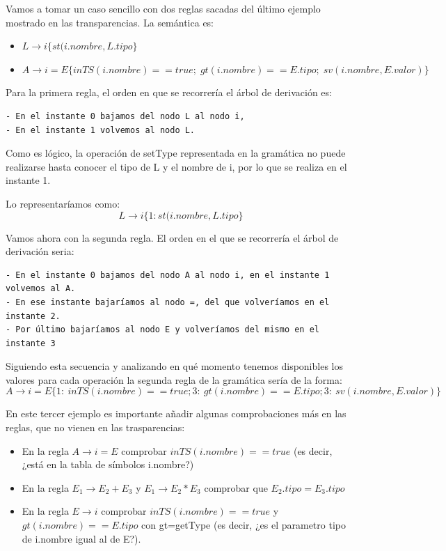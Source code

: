 \documentclass{apuntes}
\begin{document}
\begin{example}
Vamos a tomar un caso sencillo con dos reglas sacadas del último ejemplo mostrado en las transparencias. La semántica es:
\begin{itemize}
\item $L \rightarrow i \{st(i.nombre,L.tipo\}$
\item $A \rightarrow i = E \{in TS (i.nombre)==true; \; gt(i.nombre)==E.tipo; \; sv(i.nombre, E.valor)\} $
\end{itemize}

Para la primera regla, el orden en que se recorrería el árbol de derivación es:
\begin{verbatim}
- En el instante 0 bajamos del nodo L al nodo i,
- En el instante 1 volvemos al nodo L.
\end{verbatim}

Como es lógico, la operación de setType representada en la gramática no puede realizarse hasta conocer el tipo de L y el nombre de i, por lo que se realiza en el instante 1.

Lo representaríamos como:
\[L \rightarrow i \{1:st(i.nombre,L.tipo\}\]

Vamos ahora con la segunda regla. El orden en el que se recorrería el árbol de derivación seria:
\begin{verbatim}
- En el instante 0 bajamos del nodo A al nodo i, en el instante 1 volvemos al A.
- En ese instante bajaríamos al nodo =, del que volveríamos en el instante 2.
- Por último bajaríamos al nodo E y volveríamos del mismo en el instante 3
\end{verbatim}

Siguiendo esta secuencia y analizando en qué momento tenemos disponibles los valores para cada operación la segunda regla de la gramática sería de la forma:
\[A \rightarrow i = E \{ 1: \ in TS (i.nombre)==true; 3: \ gt(i.nombre)==E.tipo; 3: \ sv(i.nombre, E.valor)\}\]

En este tercer ejemplo es importante añadir algunas comprobaciones más en las reglas, que no vienen en las trasparencias:
\begin{itemize}
\item En la regla $A \rightarrow i=E$ comprobar $inTS(i.nombre)==true$ (es decir, ¿está en la tabla de símbolos i.nombre?)

\item En la regla $E_1 \rightarrow E_2 + E_3$ y $E_1 \rightarrow E_2 * E_3$ comprobar que $E_2.tipo=E_3.tipo$

\item En la regla $E \rightarrow i$ comprobar $inTS(i.nombre)==true$ y $gt(i.nombre)==E.tipo$ con gt=getType (es decir, ¿es el parametro tipo de i.nombre igual al de E?).
\end{itemize}
\end{example}
\end{document}
